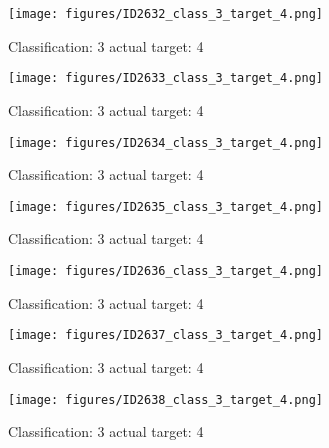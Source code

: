 \begin{figure}[h!]
\begin{center}
\texttt{[image: figures/ID2632\_class\_3\_target\_4.png]}
\end{center}
\caption{ Classification: 3 actual target: 4}
\label{fig:ID2632_class_3_target_4}
\end{figure}
\begin{figure}[h!]
\begin{center}
\texttt{[image: figures/ID2633\_class\_3\_target\_4.png]}
\end{center}
\caption{ Classification: 3 actual target: 4}
\label{fig:ID2633_class_3_target_4}
\end{figure}
\begin{figure}[h!]
\begin{center}
\texttt{[image: figures/ID2634\_class\_3\_target\_4.png]}
\end{center}
\caption{ Classification: 3 actual target: 4}
\label{fig:ID2634_class_3_target_4}
\end{figure}
\begin{figure}[h!]
\begin{center}
\texttt{[image: figures/ID2635\_class\_3\_target\_4.png]}
\end{center}
\caption{ Classification: 3 actual target: 4}
\label{fig:ID2635_class_3_target_4}
\end{figure}
\begin{figure}[h!]
\begin{center}
\texttt{[image: figures/ID2636\_class\_3\_target\_4.png]}
\end{center}
\caption{ Classification: 3 actual target: 4}
\label{fig:ID2636_class_3_target_4}
\end{figure}
\begin{figure}[h!]
\begin{center}
\texttt{[image: figures/ID2637\_class\_3\_target\_4.png]}
\end{center}
\caption{ Classification: 3 actual target: 4}
\label{fig:ID2637_class_3_target_4}
\end{figure}
\begin{figure}[h!]
\begin{center}
\texttt{[image: figures/ID2638\_class\_3\_target\_4.png]}
\end{center}
\caption{ Classification: 3 actual target: 4}
\label{fig:ID2638_class_3_target_4}
\end{figure}
